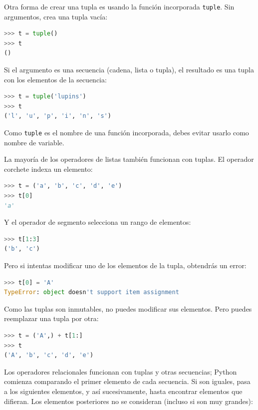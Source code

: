 Otra forma de crear una tupla es usando la función incorporada \texttt{tuple}. Sin argumentos, crea una tupla vacía:

\begin{lstlisting}[language=Python]
>>> t = tuple()
>>> t
()
\end{lstlisting}

Si el argumento es una secuencia (cadena, lista o tupla), el resultado es una tupla con los elementos de la secuencia:

\begin{lstlisting}[language=Python]
>>> t = tuple('lupins')
>>> t
('l', 'u', 'p', 'i', 'n', 's')
\end{lstlisting}

Como \texttt{tuple} es el nombre de una función incorporada, debes evitar usarlo como nombre de variable.

La mayoría de los operadores de listas también funcionan con tuplas. El operador corchete indexa un elemento:

\begin{lstlisting}[language=Python]
>>> t = ('a', 'b', 'c', 'd', 'e')
>>> t[0]
'a'
\end{lstlisting}

Y el operador de segmento selecciona un rango de elementos:

\begin{lstlisting}[language=Python]
>>> t[1:3]
('b', 'c')
\end{lstlisting}

Pero si intentas modificar uno de los elementos de la tupla, obtendrás un error:

\begin{lstlisting}[language=Python]
>>> t[0] = 'A'
TypeError: object doesn't support item assignment
\end{lstlisting}

Como las tuplas son inmutables, no puedes modificar sus elementos. Pero puedes reemplazar una tupla por otra:

\begin{lstlisting}[language=Python]
>>> t = ('A',) + t[1:]
>>> t
('A', 'b', 'c', 'd', 'e')
\end{lstlisting}

Los operadores relacionales funcionan con tuplas y otras secuencias; Python comienza comparando el primer elemento de cada secuencia. Si son iguales, pasa a los siguientes elementos, y así sucesivamente, hasta encontrar elementos que difieran. Los elementos posteriores no se consideran (incluso si son muy grandes):

